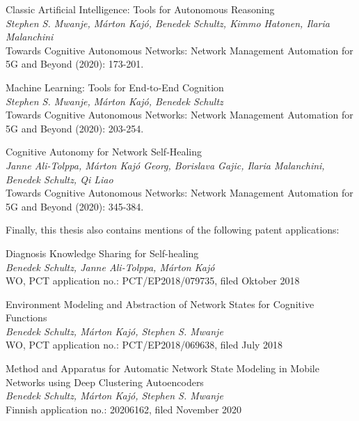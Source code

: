 			\begin{publication}
				Classic Artificial Intelligence: Tools for Autonomous Reasoning \\
				\textit{Stephen S. Mwanje, Márton Kajó, Benedek Schultz, Kimmo Hatonen, Ilaria Malanchini} \\
				Towards Cognitive Autonomous Networks: Network Management Automation for 5G and Beyond (2020): 173-201.
			\end{publication}
			
			\begin{publication}
				Machine Learning: Tools for End‐to‐End Cognition \\
				\textit{Stephen S. Mwanje, Márton Kajó, Benedek Schultz} \\
				Towards Cognitive Autonomous Networks: Network Management Automation for 5G and Beyond (2020): 203-254.
			\end{publication}
			
			\begin{publication}
				Cognitive Autonomy for Network Self‐Healing \\
				\textit{Janne Ali-Tolppa, Márton Kajó Georg, Borislava Gajic, Ilaria Malanchini, Benedek Schultz, Qi Liao} \\
				Towards Cognitive Autonomous Networks: Network Management Automation for 5G and Beyond (2020): 345-384.
			\end{publication}
			
			Finally, this thesis also contains mentions of the following patent applications:
						
			\begin{patent}
				Diagnosis Knowledge Sharing for Self-healing \\
				\textit{Benedek Schultz, Janne Ali-Tolppa, Márton Kajó} \\
				WO, PCT application no.: PCT/EP2018/079735, filed Oktober 2018
			\end{patent}
			
			\begin{patent}
				Environment Modeling and Abstraction of Network States for Cognitive Functions \\
				\textit{Benedek Schultz, Márton Kajó, Stephen S. Mwanje} \\
				WO, PCT application no.: PCT/EP2018/069638, filed July 2018
			\end{patent}
			
			\begin{patent}
				Method and Apparatus for Automatic Network State Modeling in Mobile Networks using Deep Clustering Autoencoders \\
				\textit{Benedek Schultz, Márton Kajó, Stephen S. Mwanje} \\
				Finnish application no.: 20206162, filed November 2020
			\end{patent}
		
